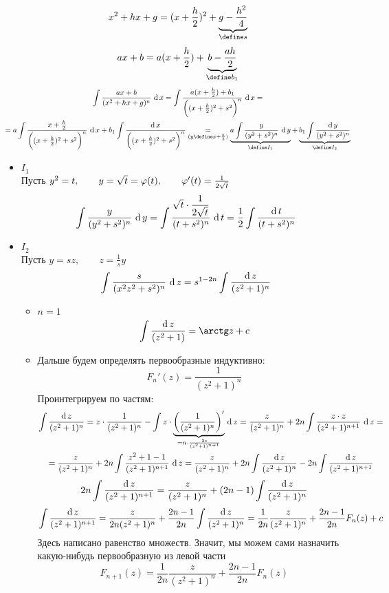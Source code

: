 \begin{statement}
    $$ x^2 + hx + g = (x + \half[h])^2 + \underbrace{g - \frac{h^2}4}_{\define s} $$
    $$ ax + b = a(x + \half[h]) + \underbrace{b - \half[ah]}_{\define b_1} $$
    \begin{multline*}
        \uint{\frac{ax + b}{(x^2 + hx + g)^n}} = \uint{\frac{a(x + \half[h]) + b_1}{\bigg( (x + \half[h])^2 + s^2 \bigg)^n}} = \\
        = a \uint{\frac{x + \half[h]}{\bigg( (x + \half[h])^2 + s^2 \bigg)^n}} + b_1\ufint{\bigg( (x + \half[h])^2 + s^2 \bigg)^n} \underset{(y \define x + \half[h])}= \underbrace{a\uint[y]{\frac{y}{(y^2 + s^2)^n}}}_{\define I_1} + \underbrace{b_1\ufint[y]{(y^2 + s^2)^n}}_{\define I_2}
    \end{multline*}
    \begin{itemize}
    	\item $ I_1 $ \\
        Пусть $ y^2 = t, \qquad y = \sqrt{t} = \vphi(t), \qquad \vphi'(t) = \frac1{2\sqrt{t}} $
        $$ \uint[y]{\frac{y}{(y^2 + s^2)^n}} = \uint[t]{\frac{\sqrt{t} \cdot \dfrac1{2\sqrt{t}}}{(t + s^2)^n}} = \half\ufint[t]{(t + s^2)^n} $$
        \item $ I_2 $ \\
        Пусть $ y = sz, \qquad z = \frac1sy $
        $$ \uint[z]{\frac{s}{(x^2z^2 + s^2)^n}} = s^{1 - 2n}\ufint[z]{(z^2 + 1)^n} $$
        \begin{itemize}
        	\item $ n = 1 $
            $$ \ufint[z]{(z^2 + 1)} = \arctg z + c $$
            \item Дальше будем определять первообразные индуктивно:
            $$ F_n'(z) = \frac1{(z^2 + 1)^n} $$
            Проинтегрируем по частям:
            \begin{multline*}
                \ufint[z]{(z^2 + 1)^n} = z \cdot \frac1{(z^2 + 1)^n} - \uint[z]{z \cdot \underbrace{\bigg( \frac1{(z^2 + 1)^n} \bigg)'}_{= n \cdot \frac{2z}{(z^2 + 1)^{n + 1}}}} = \frac{z}{(z^2 + 1)^n} + 2n \uint[z]{\frac{z \cdot z}{(z^2 + 1)^{n + 1}}} = \\
                = \frac{z}{(z^2 + 1)^n} + 2n \uint[z]{\frac{z^2 + 1 - 1}{(z^2 + 1)^{n + 1}}} = \frac{z}{(z^2 + 1)^n} + 2n \ufint[z]{(z^2 + 1)^n} - 2n \ufint[z]{(z^2 + 1)^{n + 1}}
            \end{multline*}
            $$ 2n \ufint[z]{(z^2 + 1)^{n + 1}} = \frac{z}{(z^2 + 1)^n} + (2n - 1) \ufint[z]{(z^2 + 1)^n} $$
            $$ \ufint[z]{(z^2 + 1)^{n + 1}} = \frac{z}{2n(z^2 + 1)^n} + \frac{2n - 1}{2n} \ufint[z]{(z^2 + 1)^n} = \frac1{2n}\frac{z}{(z^2 + 1)^n} + \frac{2n - 1}{2n}F_n(z) + c $$
            Здесь написано равенство множеств. Значит, мы можем сами назначить какую-нибудь первообразную из левой части
            $$ F_{n + 1}(z) = \frac1{2n} \frac{z}{(z^2 + 1)^n} + \frac{2n - 1}{2n} F_n(z) $$
        \end{itemize}
    \end{itemize}
\end{statement}

